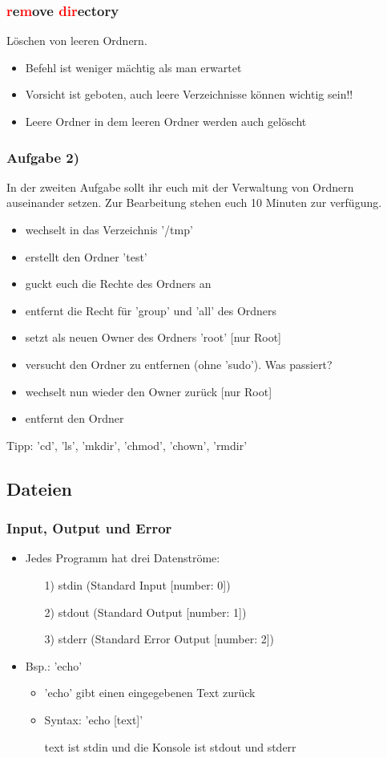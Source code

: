\documentclass[12pt,utf8]{beamer}
\begin{document}
\begin{frame}
\frametitle{\textcolor{red}{r}e\textcolor{red}{m}ove \textcolor{red}{dir}ectory}
Löschen von leeren Ordnern.
\begin{itemize}
	\item Befehl ist weniger mächtig als man erwartet
	\item Vorsicht ist geboten, auch leere Verzeichnisse können wichtig sein!!
	\item Leere Ordner in dem leeren Ordner werden auch gelöscht
\end{itemize}
\end{frame}

\begin{frame}
\frametitle{Aufgabe 2)}
In der zweiten Aufgabe sollt ihr euch mit der Verwaltung von Ordnern auseinander setzen. Zur Bearbeitung stehen euch 10 Minuten zur verfügung.
{\footnotesize
\begin{itemize}
	\item wechselt in das Verzeichnis '/tmp'
	\item erstellt den Ordner 'test'
	\item guckt euch die Rechte des Ordners an
	\item entfernt die Recht für 'group' und 'all' des Ordners
	\item setzt als neuen Owner des Ordners 'root' [nur Root]
	\item versucht den Ordner zu entfernen (ohne 'sudo'). Was passiert?
	\item wechselt nun wieder den Owner zurück [nur Root]
	\item entfernt den Ordner
\end{itemize}
}
{\scriptsize Tipp: 'cd', 'ls', 'mkdir', 'chmod', 'chown', 'rmdir'}
\end{frame}

\subsection{Dateien}
\begin{frame}
\frametitle{Input, Output und Error}
\begin{itemize}
	\item Jedes Programm hat drei Datenströme:
	\begin{itemize}
		\item[1)] stdin (Standard Input [number: 0])
		\item[2)] stdout (Standard Output [number: 1])
		\item[3)] stderr (Standard Error Output [number: 2])
	\end{itemize}
	\item Bsp.: 'echo'
	\begin{itemize}[<+->]
		\item 'echo' gibt einen eingegebenen Text zurück
		\item Syntax: 'echo [text]'
		\item [text] ist stdin und die Konsole ist stdout und stderr
	\end{itemize}
\end{itemize}
\end{frame}
\end{document}
